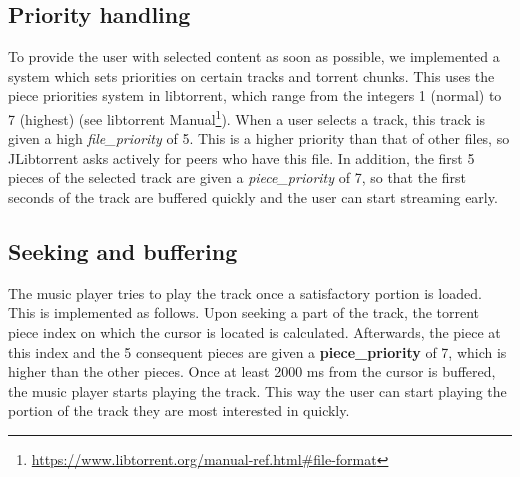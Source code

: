 \subsection{Priority handling}
To provide the user with selected content as soon as possible, we implemented a system which sets priorities on certain tracks and torrent chunks. This uses the piece priorities system in libtorrent, which range from the integers 1 (normal) to 7 (highest) (see libtorrent Manual\footnote{\url{https://www.libtorrent.org/manual-ref.html\#file-format}}). When a user selects a track, this track is given a high \textit{file\_priority} of 5. This is a higher priority than that of other files, so JLibtorrent asks actively for peers who have this file. In addition, the first 5  pieces of the selected track are given a \textit{piece\_priority} of 7, so that the first seconds of the track are buffered quickly and the user can start streaming early.
\subsection{Seeking and buffering}
The music player tries to play the track once a satisfactory portion is loaded. This is implemented as follows. Upon seeking a part of the track, the torrent piece index on which the cursor is located is calculated. Afterwards, the piece at this index and the 5 consequent pieces are given a \textbf{piece\_priority} of 7, which is higher than the other pieces. Once at least 2000 ms from the cursor is buffered, the music player starts playing the track. This way the user can start playing the portion of the track they are most interested in quickly.
